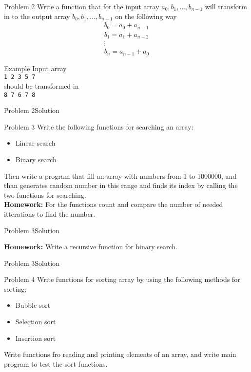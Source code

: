 \begin{frame}{Problem 2}
Write a function that for the input array $a_0, b_1, \ldots, b_{n-1}$ will
transform in to the output array $b_0, b_1,
\ldots, b_{n-1}$ on the following way
\[
\begin{array}{l}
b_0 = a_0 + a_{n-1}\\
b_1 = a_1 + a_{n-2}\\
\vdots\\
b_n = a_{n-1} + a_{0}
\end{array}
\]
\begin{exampleblock}{Example} 
Input array\\
\texttt{1 2 3 5 7}\\
should be transformed in\\
\texttt{8 7 6 7 8}
\end{exampleblock}
\end{frame}

\begin{frame}[fragile]{Problem 2}{Solution} 

\end{frame}

\begin{frame}{Problem 3}
Write the following functions for searching an array:
\begin{itemize}
  \item Linear search
  \item Binary search
\end{itemize}  
Then write a program that fill an array with numbers from 1 to 1000000,
and than generates random number in this range and finds its index by calling
the two functions for searching.\\
\textbf{Homework:} For the functions count and compare the number of needed
itterations to find the number.
\end{frame}


\begin{frame}[fragile]{Problem 3}{Solution}

\textbf{Homework:} Write a recursive function for binary search.
\end{frame}

\begin{frame}[fragile]{Problem 3}{Solution}

\end{frame}


\begin{frame}{Problem 4}
Write functions for sorting array by using the following methods for sorting:
\begin{itemize}
  \item Bubble sort
  \item Selection sort
  \item Insertion sort
\end{itemize}
Write functions fro reading and printing elements of an array, and write main
program to test the sort functions.
\end{frame}


